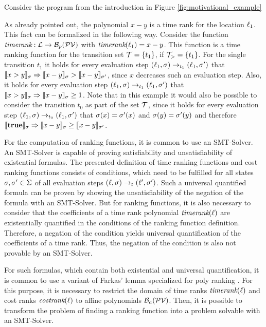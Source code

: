 \begin{example}
  Consider the program from the introduction in Figure \ref{fig:motivational_example}
  
  As already pointed out, the polynomial $x-y$ is a time rank for the location $\ell_1$.
  This fact can be formalized in the following way.
  Consider the function $\emph{timerank}: \mathcal{L} \rightarrow \mathcal{B}_p(\mathcal{PV})$ with $\emph{timerank}(\ell_1) = x-y$.
  This function is a time ranking function for the transition set $\mathcal{T} = \lbrace t_1 \rbrace$, if $\mathcal{T}_> = \lbrace t_1 \rbrace$.
  For the single transition $t_1$ it holds for every evaluation step $(\ell_1,\sigma) \rightarrow_{t_1} (\ell_1,\sigma')$ that $\llbracket x>y \rrbracket_{\sigma} \Rightarrow \llbracket x-y \rrbracket_{\sigma} > \llbracket x-y \rrbracket_{\sigma'}$, since $x$ decreases such an evaluation step.
  Also, it holds for every evaluation step $(\ell_1,\sigma) \rightarrow_{t_1} (\ell_1,\sigma')$ that $\llbracket x>y \rrbracket_{\sigma} \Rightarrow \llbracket x-y \rrbracket_{\sigma} \geq 1$.
  Note that in this example it would also be possible to consider the transition $t_0$ as part of the set $\mathcal{T}$, since it holds for every evaluation step $(\ell_1,\sigma) \rightarrow_{t_0} (\ell_1,\sigma')$ that $\sigma(x)=\sigma'(x)$ and $\sigma(y)=\sigma'(y)$ and therefore $\llbracket \textbf{true} \rrbracket_{\sigma} \Rightarrow \llbracket x-y \rrbracket_{\sigma} \geq \llbracket x-y \rrbracket_{\sigma'}$.
\end{example}

For the computation of ranking functions, it is common to use an SMT-Solver.
An SMT-Solver is capable of proving satisfiability and unsatisfiability of existential formulas.
The presented definition of time ranking functions and cost ranking functions consists of conditions, which need to be fulfilled for all states $\sigma, \sigma' \in \Sigma$ of all evaluation steps $(\ell, \sigma) \rightarrow_t (\ell', \sigma')$.
Such a universal quantified formula can be proven by showing the unsatisfiability of the negation of the formula with an SMT-Solver.
But for ranking functions, it is also necessary to consider that the coefficients of a time rank polynomial $\emph{timerank}(\ell)$ are existentially quantified in the conditions of the ranking function definition.
Therefore, a negation of the condition yields universal quantification of the coefficients of a time rank.
Thus, the negation of the condition is also not provable by an SMT-Solver.

For such formulas, which contain both existential and universal quantification, it is common to use a variant of Farkas' lemma \cite{schrijver1998theory} specialized for poly ranking \cite{bradley2005polyranking}.
For this purpose, it is necessary to restrict the domain of time ranks $\emph{timerank}(\ell)$ and cost ranks $\emph{costrank}(\ell)$ to affine polynomials $\mathcal{B}_a(\mathcal{PV})$.
Then, it is possible to transform the problem of finding a ranking function into a problem solvable with an SMT-Solver.
